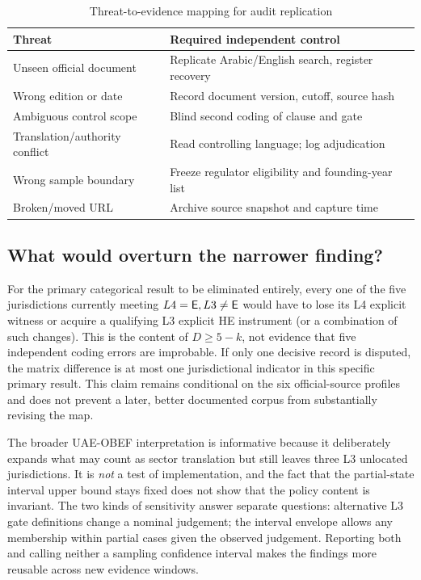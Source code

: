 \begin{table}[t]
\centering\caption{Threat-to-evidence mapping for audit replication}\label{tab:threats}\footnotesize
\begin{tabularx}{\columnwidth}{@{}p{}X@{}}
\toprule
Threat & Required independent control\tabularnewline\midrule
Unseen official document & Replicate Arabic/English search, register recovery\tabularnewline
Wrong edition or date & Record document version, cutoff, source hash\tabularnewline
Ambiguous control scope & Blind second coding of clause and gate\tabularnewline
Translation/authority conflict & Read controlling language; log adjudication\tabularnewline
Wrong sample boundary & Freeze regulator eligibility and founding-year list\tabularnewline
Broken/moved URL & Archive source snapshot and capture time\tabularnewline
\bottomrule
\end{tabularx}
\end{table}

\subsection{What would overturn the narrower finding?}
For the primary categorical result to be eliminated entirely, every one of the five jurisdictions currently meeting $L4=\textsf{E},L3\ne\textsf{E}$ would have to lose its L4 explicit witness or acquire a qualifying L3 explicit HE instrument (or a combination of such changes). This is the content of $D\geq5-k$, not evidence that five independent coding errors are improbable. If only one decisive record is disputed, the matrix difference is at most one jurisdictional indicator in this specific primary result. This claim remains conditional on the six official-source profiles and does not prevent a later, better documented corpus from substantially revising the map.

The broader UAE-OBEF interpretation is informative because it deliberately expands what may count as sector translation but still leaves three L3 unlocated jurisdictions. It is \emph{not} a test of implementation, and the fact that the partial-state interval upper bound stays fixed does not show that the policy content is invariant. The two kinds of sensitivity answer separate questions: alternative L3 gate definitions change a nominal judgement; the interval envelope allows any membership within partial cases given the observed judgement. Reporting both and calling neither a sampling confidence interval makes the findings more reusable across new evidence windows.
